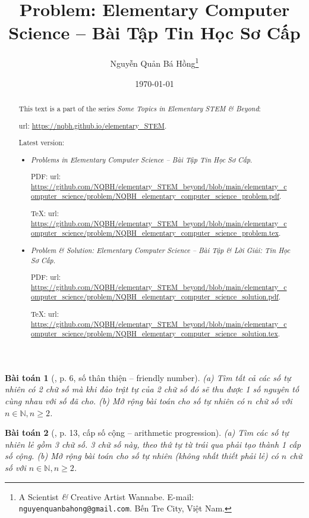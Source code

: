 \documentclass{article}
\title{Problem: Elementary Computer Science -- Bài Tập Tin Học Sơ Cấp}
\author{Nguyễn Quản Bá Hồng\footnote{A Scientist {\it\&} Creative Artist Wannabe. E-mail: {\tt nguyenquanbahong@gmail.com}. Bến Tre City, Việt Nam.}}
\date{\today}
\newtheorem{baitoan}{Bài toán}
\begin{document}
	\maketitle
\begin{abstract}
	This text is a part of the series {\it Some Topics in Elementary STEM \& Beyond}:
	
	{\sc url}: \url{https://nqbh.github.io/elementary_STEM}.
	
	Latest version:
	\begin{itemize}
		\item {\it Problems in Elementary Computer Science -- Bài Tập Tin Học Sơ Cấp}.
		
		PDF: {\sc url}: \url{https://github.com/NQBH/elementary_STEM_beyond/blob/main/elementary_computer_science/problem/NQBH_elementary_computer_science_problem.pdf}.
		
		\TeX: {\sc url}: \url{https://github.com/NQBH/elementary_STEM_beyond/blob/main/elementary_computer_science/problem/NQBH_elementary_computer_science_problem.tex}.
		\item {\it Problem \& Solution: Elementary Computer Science -- Bài Tập \& Lời Giải: Tin Học Sơ Cấp}.
		
		PDF: {\sc url}: \url{https://github.com/NQBH/elementary_STEM_beyond/blob/main/elementary_computer_science/problem/NQBH_elementary_computer_science_solution.pdf}.
		
		\TeX: {\sc url}: \url{https://github.com/NQBH/elementary_STEM_beyond/blob/main/elementary_computer_science/problem/NQBH_elementary_computer_science_solution.tex}.
	\end{itemize}
\end{abstract}
\tableofcontents


\begin{baitoan}[\cite{Huy_sang_tao_thuat_toan_lap_trinh_tap_1}, p. 6, số thân thiện -- friendly number]
	(a) Tìm tất cả các số tự nhiên có 2 chữ số mà khi đảo trật tự của 2 chữ số đó sẽ thu được 1 số nguyên tố cùng nhau với số đã cho. (b) Mở rộng bài toán cho số tự nhiên có $n$ chữ số với $n\in\mathbb{N},n\ge2$.
\end{baitoan}

\begin{baitoan}[\cite{Huy_sang_tao_thuat_toan_lap_trinh_tap_1}, p. 13, cấp số cộng -- arithmetic progression]
	(a) Tìm các số tự nhiên lẻ gồm 3 chữ số. 3 chữ số này, theo thứ tự từ trái qua phải tạo thành 1 cấp số cộng. (b) Mở rộng bài toán cho số tự nhiên (không nhất thiết phải lẻ) có $n$ chữ số với $n\in\mathbb{N},n\ge2$.
\end{baitoan}
\end{document}

